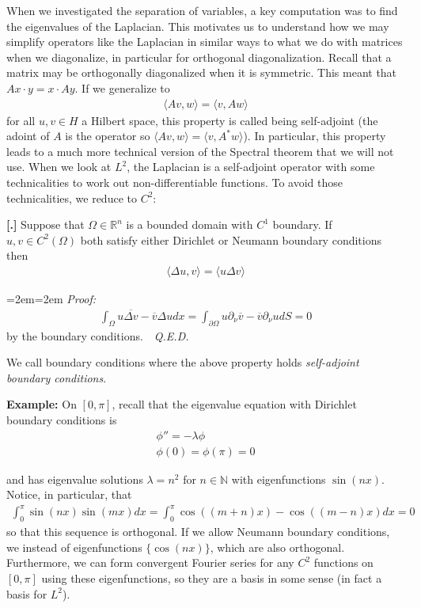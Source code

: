 \documentclass{article}
\newcommand{\N}{{\mathbb{N}}}
\newcommand{\R}{{\mathbb{R}}}
\newcommand{\cl}[1]{{\overline{#1}}}
\newcommand{\pd}{\partial}
\newcounter{result}[section]
\newenvironment{res}[1][]{\refstepcounter{result}\par\medskip
	\noindent \textbf{[\thesection.\theresult] #1} \rmfamily}{\medskip}
\newenvironment{pf}{%
	\par%
	\medskip
	\leftskip=2em\rightskip=2em%
	\noindent\ignorespaces \textit{Proof:} \newline}{%
	\,\, \newline \textit{Q.E.D.}\par\medskip}
\begin{document}
	When we investigated the separation of variables, a key computation was to find the eigenvalues of the Laplacian. This motivates us to understand how we may simplify operators like the Laplacian in similar ways to what we do with matrices when we diagonalize, in particular for orthogonal diagonalization. Recall that a matrix may be orthogonally diagonalized when it is symmetric. This meant that $Ax \cdot y = x \cdot Ay$. If we generalize to 
	\begin{align*}
		\langle Av,w \rangle  = \langle v,Aw\rangle 
	\end{align*}
	for all $u,v\in H$ a Hilbert space, this property is called being self-adjoint (the adoint of $A$ is the operator so $\langle Av,w \rangle  = \langle v, A^* w \rangle $). In particular, this property leads to a much more technical version of the Spectral theorem that we will not use. When we look at $L^{2}$, the Laplacian is a self-adjoint operator with some technicalities to work out non-differentiable functions. To avoid those technicalities, we reduce to $C^{2}$:
	
	\begin{res}
		Suppose that $\Omega \in \R^{n}$ is a bounded domain with $C^{1}$ boundary. If $u,v \in C^{2}(\Omega)$ both satisfy either Dirichlet or Neumann boundary conditions then 
		\begin{align*}
			\langle \Delta u, v \rangle  = \langle u \Delta v \rangle 
		\end{align*}
	\end{res}
	\begin{pf}
		\begin{align*}
			\int_{\Omega} u \cl{\Delta v} - \cl{v} \Delta u  dx = \int_{\pd \Omega} u \pd_{\nu}\cl{v} - \cl{v} \pd_{\nu} u dS =0
		\end{align*}
		by the boundary conditions. 
	\end{pf}
	
	We call boundary conditions where the above property holds \textit{self-adjoint boundary conditions}. 
	
	\vspace{0.25 cm}
	\textbf{Example:} On $[0,\pi]$, recall that the eigenvalue equation with Dirichlet boundary conditions is 
	\begin{align*}
		\phi '' = - \lambda \phi \\
		\phi(0) = \phi(\pi) = 0
	\end{align*}
	
	and has eigenvalue solutions $\lambda = n^{2}$ for $n \in \N$ with eigenfunctions $\sin(nx)$. Notice, in particular, that 
	\begin{align*}
		\int_{0}^{\pi} \sin(nx) \sin(mx) dx = \int_{0}^{\pi}\cos((m+n)x) - \cos((m-n)x) dx= 0
	\end{align*}
	so that this sequence is orthogonal. If we allow Neumann boundary conditions, we instead of eigenfunctions $\{\cos(nx)\}$, which are also orthogonal. Furthermore, we can form convergent Fourier series for any $C^{2}$ functions on $[0,\pi]$ using these eigenfunctions, so they are a basis in some sense (in fact a basis for $L^{2}$). 
	
\end{document}
